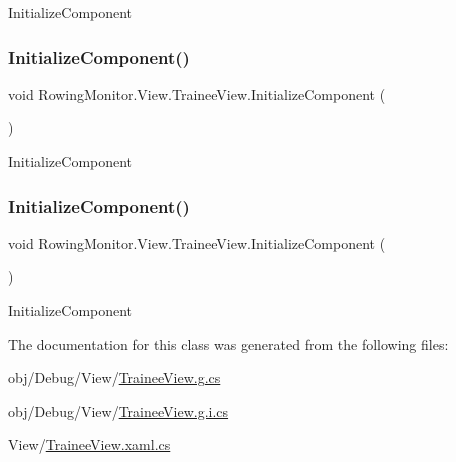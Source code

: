 Initialize\+Component 

\mbox{\label{class_rowing_monitor_1_1_view_1_1_trainee_view_aafd3b2c6136bc2da309abd7b3706619a}} 
\subsubsection{\texorpdfstring{Initialize\+Component()}{InitializeComponent()}\hspace{0.1cm}{\footnotesize\ttfamily [3/4]}}
{\footnotesize\ttfamily void Rowing\+Monitor.\+View.\+Trainee\+View.\+Initialize\+Component (\begin{DoxyParamCaption}{ }\end{DoxyParamCaption})}



Initialize\+Component 

\mbox{\label{class_rowing_monitor_1_1_view_1_1_trainee_view_aafd3b2c6136bc2da309abd7b3706619a}} 
\subsubsection{\texorpdfstring{Initialize\+Component()}{InitializeComponent()}\hspace{0.1cm}{\footnotesize\ttfamily [4/4]}}
{\footnotesize\ttfamily void Rowing\+Monitor.\+View.\+Trainee\+View.\+Initialize\+Component (\begin{DoxyParamCaption}{ }\end{DoxyParamCaption})}



Initialize\+Component 



The documentation for this class was generated from the following files\+:\begin{DoxyCompactItemize}
\item 
obj/\+Debug/\+View/\hyperlink{_debug_2_view_2_trainee_view_8g_8cs}{Trainee\+View.\+g.\+cs}\item 
obj/\+Debug/\+View/\hyperlink{_debug_2_view_2_trainee_view_8g_8i_8cs}{Trainee\+View.\+g.\+i.\+cs}\item 
View/\hyperlink{_trainee_view_8xaml_8cs}{Trainee\+View.\+xaml.\+cs}\end{DoxyCompactItemize}

